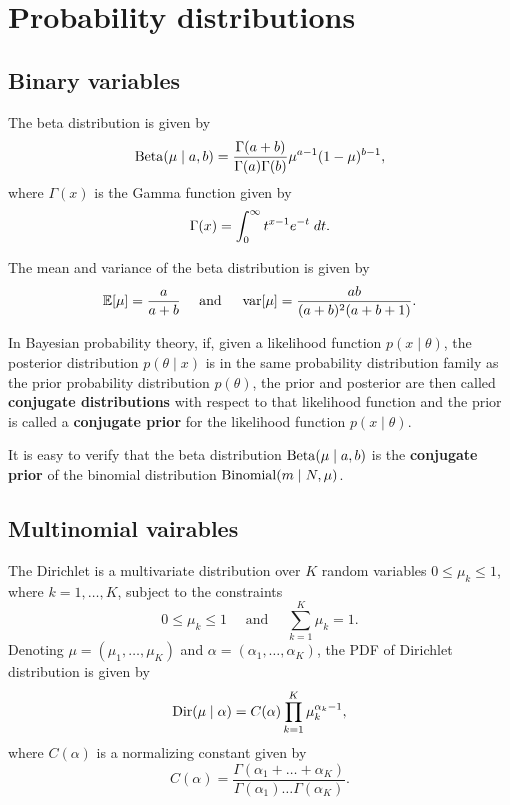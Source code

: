 \documentclass[a4paper]{article}
\begin{document}
\maketitle

\tableofcontents

\section{Probability distributions}

\subsection{Binary variables}

\begin{defi}
The beta distribution is given by 
\[
\operatorname{Beta}(\mu \mid a, b) 
= \frac{\Gamma(a + b)}{\Gamma(a) \Gamma(b)}
\mu^{a - 1} (1 - \mu)^{b - 1},
\]
where $\Gamma(x)$ is the Gamma function given by 
\[
\Gamma(x) = \int_0^\infty t^{x - 1} e^{-t} \; d t.
\]
\end{defi}
The mean and variance of the beta distribution is given 
by 
\[
\begin{aligned}
\mathbb{E}[\mu] = \frac{a}{a + b}
\quad \text{ and } \quad
\operatorname{var}[\mu] = \frac{ab}{(a + b)^2 (a + b + 1)}.
\end{aligned}
\]

\begin{defi}
In Bayesian probability theory, if, given a likelihood 
function $p(x \mid \theta)$, the posterior distribution 
$p(\theta \mid x)$ is in the same probability distribution 
family as the prior probability distribution 
$p(\theta)$, the prior and posterior are then called 
\textbf{conjugate distributions} with respect to that 
likelihood function and the prior is called a \textbf{conjugate 
prior} for the likelihood function $p(x \mid \theta)$. 
\end{defi}

It is easy to verify that the beta distribution $\operatorname{Beta}
(\mu \mid a, b)$ is  
the \textbf{conjugate prior} of the binomial distribution
$\operatorname{Binomial}(m \mid N, \mu)$.

\subsection{Multinomial vairables}

\begin{defi}
The Dirichlet is a multivariate distribution over $K$ 
random variables $0 \leq \mu_k \leq 1$,
where $k = 1, \dots, K$, subject to the constraints
\[
0 \leq \mu_k \leq 1 \quad 
\text{ and } \quad \sum_{k=1}^K \mu_k = 1.
\]
Denoting $\mu = (\mu_1, \dots, \mu_K)$ and 
$\alpha = (\alpha_1, \dots, \alpha_K)$,
the PDF of Dirichlet distribution is given by 
\[
\operatorname{Dir}(\mu \mid \alpha)
= C(\alpha) \prod_{k=1}^K \mu_k^{\alpha_k - 1},
\]
where $C(\alpha)$ is a normalizing constant given by 
\[
C(\alpha) = \frac{\Gamma(\alpha_1 + \dots + \alpha_K)}
{\Gamma(\alpha_1) \dots \Gamma(\alpha_K)}.
\]
\end{defi}
\end{document}
